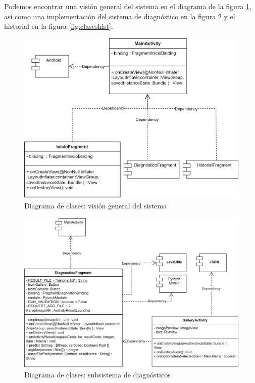  Podemos encontrar una visión general del sistema en el diagrama de la figura \ref{fig:clasesglobal}, así como una implementación del sistema de diagnóstico en la figura \ref{fig:clasesdiag} y el historial en la figura \ref{fig:claseshist}.
 
    \begin{figure}[H]
 	\centering
 	\includegraphics[scale = 0.75]{imagenes/DiagramaGeneral.png}
 	\caption{Diagrama de clases: visión general del sistema}
 	\label{fig:clasesglobal}
 \end{figure}
 
     \begin{figure}[H]
 	\centering
 	\includegraphics[scale = 0.75]{imagenes/androidAPP-Diagnostico.png}
 	\caption{Diagrama de clases: subsistema de diagnósticos}
 	\label{fig:clasesdiag}
 \end{figure}
 
